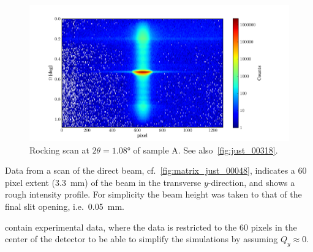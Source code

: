 \documentclass[10pt,twoside, b5paper,pdftex]{report}
\begin{document}
\begin{figure}[htbp]
	\begin{center}
		\includegraphics[width=1.2\textwidth]{figures/matrix_just_00318.pdf}
	\end{center}
	\caption{Rocking scan at $2\theta = 1.08$\si{\degree} of sample A. See also~\cref{fig:just_00318}. \label{fig:matrix_just_00318}}
\end{figure}
Data from a scan of the direct beam, cf.~\cref{fig:matrix_just_00048}, indicates a $60$ pixel extent (\SI{3.3}{\milli\meter}) of the beam in the transverse $y$-direction, and shows a rough intensity profile.   For simplicity the beam height was taken to that of the final slit opening, i.e.~\SI{0.05}{\milli\meter}. 

  contain experimental data, where the data is  restricted to the $60$ pixels in the center of the detector to be able to simplify the simulations by assuming $Q_y \approx 0$. 
\end{document}
